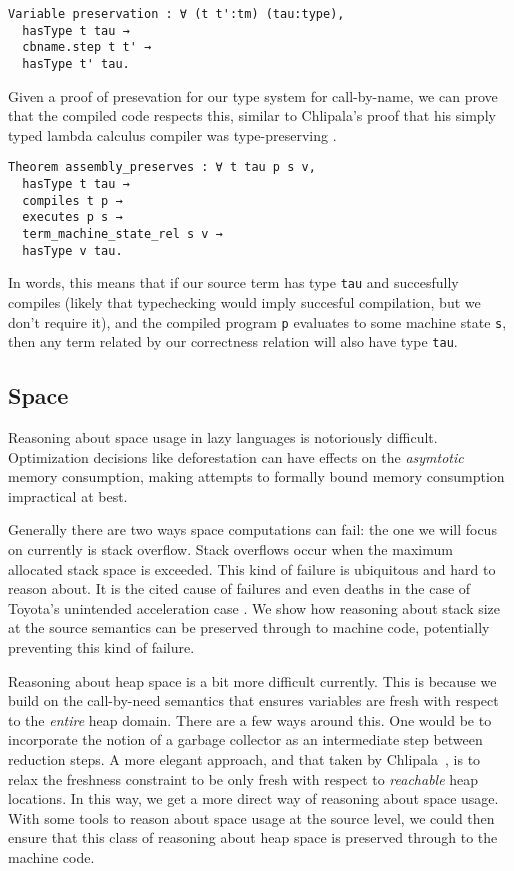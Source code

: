 \begin{lstlisting}
Variable preservation : ∀ (t t':tm) (tau:type), 
  hasType t tau → 
  cbname.step t t' →
  hasType t' tau.
\end{lstlisting}

Given a proof of presevation for our type system for call-by-name, we can prove
that the compiled code respects this, similar to Chlipala's proof that his
simply typed lambda calculus compiler was type-preserving \cite{?}.

\begin{lstlisting}
Theorem assembly_preserves : ∀ t tau p s v, 
  hasType t tau → 
  compiles t p → 
  executes p s →
  term_machine_state_rel s v → 
  hasType v tau.
\end{lstlisting}

In words, this means that if our source term has type \texttt{tau} and
succesfully compiles (likely that typechecking would imply succesful compilation,
but we don't require it), and the compiled program \texttt{p} evaluates to some
machine state \texttt{s}, then any term related by our correctness relation will
also have type \texttt{tau}.

\subsection{Space}

Reasoning about space usage in lazy languages is notoriously difficult.
Optimization decisions like deforestation can have effects on the
\emph{asymtotic} memory consumption, making attempts to formally bound memory
consumption impractical at best. 

Generally there are two ways space computations can fail: the one we will focus
on currently is stack overflow. Stack overflows occur when the maximum allocated
stack space is exceeded. This kind of failure is ubiquitous and hard to reason
about. It is the cited cause of failures and even deaths in the case of Toyota's
unintended acceleration case \cite{?}. We show how reasoning about stack size at
the source semantics can be preserved through to machine code, potentially
preventing this kind of failure.  

Reasoning about heap space is a bit more difficult currently. This is
because we build on the call-by-need semantics that ensures variables are fresh
with respect to the \emph{entire} heap domain. There are a few ways around this.
One would be to incorporate the notion of a garbage collector as an intermediate
step between reduction steps. A more elegant approach, and that taken by
Chlipala~\cite{chlipala}, is to relax the freshness constraint to be only fresh
with respect to \emph{reachable} heap locations. In this way, we get a more
direct way of reasoning about space usage. With some tools to reason about space
usage at the source level, we could then ensure that this class of reasoning
about heap space is preserved through to the machine code.


